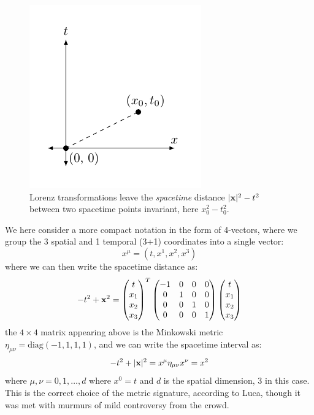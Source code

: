 \begin{figure}[htbp]
    \centering
    \includegraphics[]{Lectures/Figures/spacetime_interval.pdf}
    \caption{Lorenz transformations leave the \emph{spacetime} distance $\lvert \mathbf{x} \rvert^2 - t^2$ between two spacetime points invariant, here $x_0^2 - t_0^2$.}
    \label{eq:spacetime_interval}
\end{figure}

We here consider a more compact notation in the form of 4-vectors, where we group the 3 spatial and 1 temporal (3+1) coordinates into a single vector:
\begin{equation}
    x^\mu = (t, x^1, x^2, x^3)
\end{equation}
where we can then write the spacetime distance as:
\begin{equation}
    -t^2 + \mathbf{x}^2 = \begin{pmatrix}t \\ x_1 \\ x_2 \\ x_3\end{pmatrix}^T \begin{pmatrix}-1 & 0 & 0 & 0 \\ 0 & 1 & 0 & 0 \\ 0 & 0 & 1 & 0 \\ 0 & 0 & 0 & 1\end{pmatrix}\begin{pmatrix}t \\ x_1 \\ x_2 \\ x_3\end{pmatrix}
\end{equation}
the $4 \times 4$ matrix appearing above is the Minkowski metric $\eta_{\mu\nu} = \text{diag}(-1, 1, 1, 1)$, and we can write the spacetime interval as:
\begin{equation}
    -t^2 + \lvert \mathbf{x} \rvert^2 = x^\mu \eta_{\mu \nu} x^\nu = x^2
\end{equation}
where $\mu, \nu = 0, 1, \ldots, d$ where $x^0 = t$ and $d$ is the spatial dimension, $3$ in this case. This is the correct choice of the metric signature, according to Luca, though it was met with murmurs of mild controversy from the crowd.

